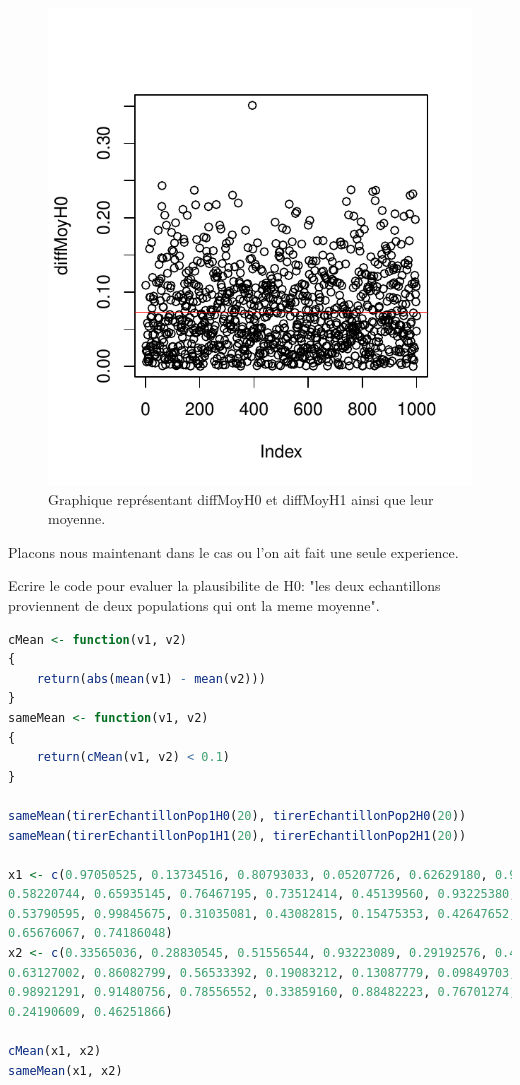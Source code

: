 \begin{figure}[htbp]
	\begin{center}
		\includegraphics[width=12cm]{diffMoy.pdf}
		\caption{Graphique représentant diffMoyH0 et diffMoyH1 ainsi que leur moyenne.}
		\label{fig:diffMoy}
	\end{center}
\end{figure}


Placons nous maintenant dans le cas ou l'on ait fait
une seule experience.

Ecrire le code pour evaluer la plausibilite de H0: "les deux 
echantillons proviennent de deux populations qui ont la meme moyenne".

\begin{lstlisting}[language=R]
cMean <- function(v1, v2)
{
	return(abs(mean(v1) - mean(v2)))
}
sameMean <- function(v1, v2)
{
	return(cMean(v1, v2) < 0.1)
}

sameMean(tirerEchantillonPop1H0(20), tirerEchantillonPop2H0(20))
sameMean(tirerEchantillonPop1H1(20), tirerEchantillonPop2H1(20))

x1 <- c(0.97050525, 0.13734516, 0.80793033, 0.05207726, 0.62629180, 0.93485856,
0.58220744, 0.65935145, 0.76467195, 0.73512414, 0.45139560, 0.93225380,
0.53790595, 0.99845675, 0.31035081, 0.43082815, 0.15475353, 0.42647652,
0.65676067, 0.74186048)
x2 <- c(0.33565036, 0.28830545, 0.51556544, 0.93223089, 0.29192576, 0.43505823,
0.63127002, 0.86082799, 0.56533392, 0.19083212, 0.13087779, 0.09849703,
0.98921291, 0.91480756, 0.78556552, 0.33859160, 0.88482223, 0.76701274,
0.24190609, 0.46251866)

cMean(x1, x2)
sameMean(x1, x2)
\end{lstlisting}

